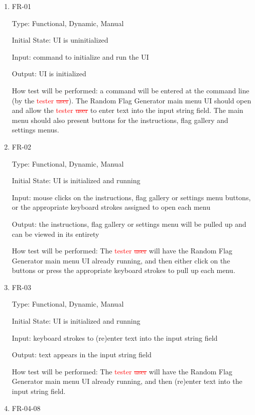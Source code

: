 \documentclass[12pt, titlepage]{article}
\begin{document}
\begin{enumerate}

\item{FR-01\\}

Type: Functional, Dynamic, Manual

Initial State: UI is uninitialized

Input: command to initialize and run the UI

Output: UI is initialized

How test will be performed: a command will be entered at the command line (by
the \textcolor{red}{tester \sout{user}}). The Random Flag Generator main menu
UI should open and allow the \textcolor{red}{tester \sout{user}} to enter text
into the input string field. The main menu should also present buttons for the
instructions, flag gallery and settings menus.

\item{FR-02\\}

Type: Functional, Dynamic, Manual

Initial State: UI is initialized and running

Input: mouse clicks on the instructions, flag gallery or settings menu
buttons, or the appropriate keyboard strokes assigned to open each menu

Output: the instructions, flag gallery or settings menu will be pulled up and
can be viewed in its entirety

How test will be performed: The \textcolor{red}{tester \sout{user}} will have
the Random Flag Generator main menu UI already running, and then either click
on the buttons or press the appropriate keyboard strokes to pull up each menu.

\item{FR-03\\}

Type: Functional, Dynamic, Manual

Initial State: UI is initialized and running

Input: keyboard strokes to (re)enter text into the input string field

Output: text appears in the input string field

How test will be performed: The \textcolor{red}{tester \sout{user}} will have
the Random Flag Generator main menu UI already running, and then (re)enter
text into the input string field.

\item{FR-04-08\\}


\end{enumerate}
\end{document}
